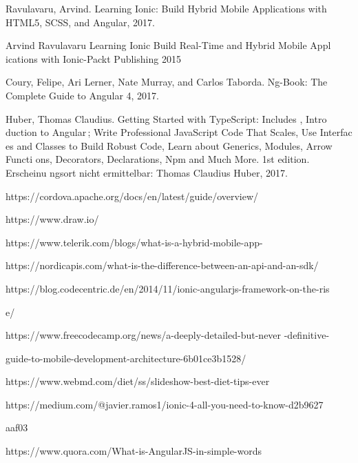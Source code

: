 \documentclass[a4paper,12pt]{article}
\begin{document}
			Ravulavaru, Arvind. Learning Ionic: Build Hybrid Mobile Applications with HTML5, SCSS, and Angular, 2017.

			Arvind Ravulavaru Learning Ionic Build Real-Time and Hybrid 
			Mobile Appl
			ications with Ionic-Packt Publishing 2015
			
			Coury, Felipe, Ari Lerner, Nate Murray, and Carlos Taborda. Ng-Book: The Complete Guide to Angular 4, 2017.

			Huber, Thomas Claudius. Getting Started with TypeScript: Includes ,
			Intro
			duction to Angular ; Write Professional JavaScript Code That Scales, Use Interfac
			es and Classes to Build Robust Code, 
			Learn about Generics, Modules, Arrow Functi
			ons, Decorators, Declarations, Npm and Much More. 1st edition. 
			Erscheinu
			ngsort nicht ermittelbar: Thomas Claudius Huber, 2017.

			https://cordova.apache.org/docs/en/latest/guide/overview/

			https://www.draw.io/

			https://www.telerik.com/blogs/what-is-a-hybrid-mobile-app-
			
			https://nordicapis.com/what-is-the-difference-between-an-api-and-an-sdk/ 
			
			https://blog.codecentric.de/en/2014/11/ionic-angularjs-framework-on-the-ris
			
			e/
			
			https://www.freecodecamp.org/news/a-deeply-detailed-but-never
			-definitive-

			guide-to-mobile-development-architecture-6b01ce3b1528/
			
			https://www.webmd.com/diet/ss/slideshow-best-diet-tips-ever
			
			https://medium.com/@javier.ramos1/ionic-4-all-you-need-to-know-d2b9627
			
			aaf03

			https://www.quora.com/What-is-AngularJS-in-simple-words
			
			
\end{document}
